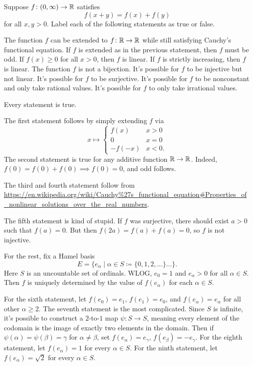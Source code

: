 \begin{problem}
	Suppose $f \colon (0,\infty) \to \mathbb R$ satisfies
	\[ f(x+y) = f(x) + f(y) \]
	for all $x,y > 0$.
	Label each of the following statements as true or false.
	\begin{enumerate}
		\ii The function $f$ can be extended to $f \colon \mathbb R \to \mathbb R$
		while still satisfying Cauchy's functional equation.
		\ii If $f$ is extended as in the previous statement, then $f$ must be odd.
		\ii If $f(x) \ge 0$ for all $x > 0$, then $f$ is linear.
		\ii If $f$ is strictly increasing, then $f$ is linear.
		\ii The function $f$ is not a bijection.
		\ii It's possible for $f$ to be injective but not linear.
		\ii It's possible for $f$ to be surjective.
		\ii It's possible for $f$ to be nonconstant and only take rational values.
		\ii It's possible for $f$ to only take irrational values.
	\end{enumerate}
	\begin{sol}
	Every statement is true.

	The first statement follows by simply extending $f$ via
	\[
		x \mapsto
		\begin{cases}
			f(x) & x > 0 \\
			0 & x = 0 \\
			-f(-x) & x < 0.
		\end{cases}
	\]
	The second statement is true for any additive function $\mathbb R \to \mathbb R$.
	Indeed, $f(0) = f(0)+f(0) \implies f(0)=0$, and odd follows.

	The third and fourth statement follow from
	\url{https://en.wikipedia.org/wiki/Cauchy\%27s_functional_equation#Properties_of_nonlinear_solutions_over_the_real_numbers}.

	The fifth statement is kind of stupid.
	If $f$ was surjective, there should exist $a > 0$ such that $f(a) = 0$.
	But then $f(2a) = f(a)+f(a) = 0$, so $f$ is not injective.

	For the rest, fix a Hamel basis
	\[ E = \{e_\alpha \mid \alpha \in S \coloneqq \{ 0,1,2,\dots\} \dots \}. \]
	Here $S$ is an uncountable set of ordinals.
	WLOG, $e_0 = 1$ and $e_\alpha > 0$ for all $\alpha \in S$.
	Then $f$ is uniquely determined by the value of $f(e_\alpha)$ for each $\alpha \in S$.
	\begin{itemize}
		\ii For the sixth statement, let $f(e_0) = e_1$, $f(e_1) = e_0$,
		and $f(e_\alpha) = e_\alpha$ for all other $\alpha \ge 2$.
		\ii The seventh statement is the most complicated.
		Since $S$ is infinite, it's possible to construct a $2$-to-$1$ map
		$\psi \colon S \to S$, meaning every element of the codomain
		is the image of exactly two elements in the domain.
		Then if $\psi(\alpha) = \psi(\beta) = \gamma$ for $\alpha \neq \beta$,
		set $f(e_\alpha) = e_\gamma$, $f(e_\beta) = -e_\gamma$.
		\ii For the eighth statement, let $f(e_\alpha) = 1$ for every $\alpha \in S$.
		\ii For the ninth statement, let $f(e_\alpha) = \sqrt 2$ for every $\alpha \in S$.
	\end{itemize}
	\end{sol}
\end{problem}

